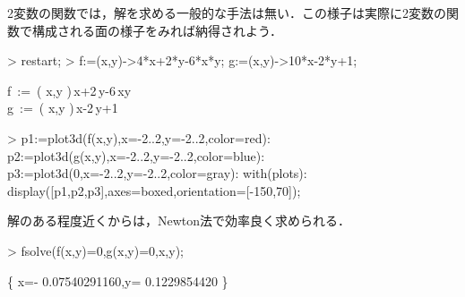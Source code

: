 2変数の関数では，解を求める一般的な手法は無い．この様子は実際に2変数の関数で構成される面の様子をみれば納得されよう．
\begin{MapleInput}
> restart;
> f:=(x,y)->4*x+2*y-6*x*y; g:=(x,y)->10*x-2*y+1;
\end{MapleInput}
\begin{MapleOutputGather}
f\, := \,( {x,y} )\,x+2\,y-6\,xy \notag \\
g\, := \,( {x,y} )\,x-2\,y+1 \notag
\end{MapleOutputGather}
\begin{MapleInput}
> p1:=plot3d({f(x,y)},x=-2..2,y=-2..2,color=red):
  p2:=plot3d({g(x,y)},x=-2..2,y=-2..2,color=blue):
  p3:=plot3d({0},x=-2..2,y=-2..2,color=gray):
  with(plots):
  display([p1,p2,p3],axes=boxed,orientation=[-150,70]);
\end{MapleInput}

解のある程度近くからは，Newton法で効率良く求められる．
\begin{MapleInput}
> fsolve({f(x,y)=0,g(x,y)=0},{x,y});
\end{MapleInput}
\begin{MapleOutput}
\left\{ x=- 0.07540291160,y= 0.1229854420 \right\}
\end{MapleOutput}
